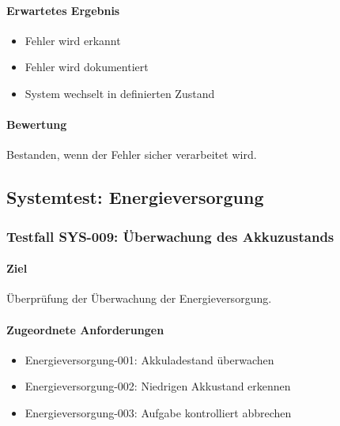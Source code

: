 \paragraph{Erwartetes Ergebnis}\label{erwartetes-ergebnis-31}

\begin{itemize}
\tightlist
\item
  Fehler wird erkannt
\item
  Fehler wird dokumentiert
\item
  System wechselt in definierten Zustand
\end{itemize}

\paragraph{Bewertung}\label{bewertung-31}

Bestanden, wenn der Fehler sicher verarbeitet wird.

\subsection{Systemtest:
Energieversorgung}\label{systemtest-energieversorgung}

\subsubsection{Testfall SYS-009: Überwachung des
Akkuzustands}\label{testfall-sys-009-uxfcberwachung-des-akkuzustands}

\paragraph{Ziel}\label{ziel-32}

Überprüfung der Überwachung der Energieversorgung.

\paragraph{Zugeordnete
Anforderungen}\label{zugeordnete-anforderungen-32}

\begin{itemize}
\tightlist
\item
  Energieversorgung-001: Akkuladestand überwachen
\item
  Energieversorgung-002: Niedrigen Akkustand erkennen
\item
  Energieversorgung-003: Aufgabe kontrolliert abbrechen
\end{itemize}

